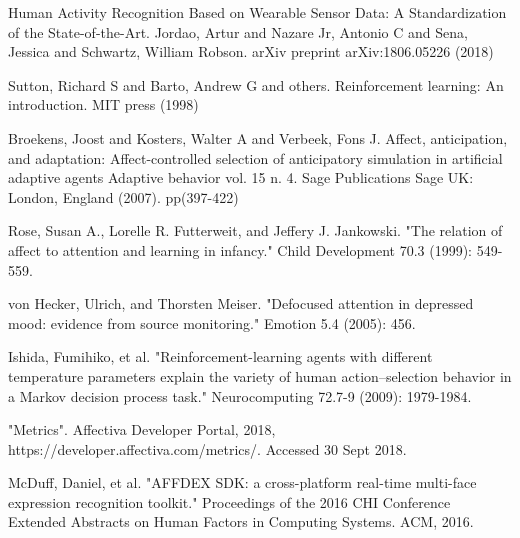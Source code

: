 \documentclass[conference]{IEEEtran}
\begin{document}
\begin{thebibliography}{1}
Human Activity Recognition Based on Wearable Sensor Data: A Standardization of the State-of-the-Art. Jordao, Artur and Nazare Jr, Antonio C and Sena, Jessica and Schwartz, William Robson. arXiv preprint arXiv:1806.05226 (2018)

Sutton, Richard S and Barto, Andrew G and others. Reinforcement learning: An introduction. MIT press (1998)

Broekens, Joost and Kosters, Walter A and Verbeek, Fons J. Affect, anticipation, and adaptation: Affect-controlled selection of anticipatory simulation in artificial adaptive agents Adaptive behavior vol. 15 n. 4. Sage Publications Sage UK: London, England (2007). pp(397-422)

Rose, Susan A., Lorelle R. Futterweit, and Jeffery J. Jankowski. "The relation of affect to attention and learning in infancy." Child Development 70.3 (1999): 549-559.

von Hecker, Ulrich, and Thorsten Meiser. "Defocused attention in depressed mood: evidence from source monitoring." Emotion 5.4 (2005): 456.

Ishida, Fumihiko, et al. "Reinforcement-learning agents with different temperature parameters explain the variety of human action–selection behavior in a Markov decision process task." Neurocomputing 72.7-9 (2009): 1979-1984.

 "Metrics". Affectiva Developer Portal, 2018, https://developer.affectiva.com/metrics/. Accessed 30 Sept 2018.

McDuff, Daniel, et al. "AFFDEX SDK: a cross-platform real-time multi-face expression recognition toolkit." Proceedings of the 2016 CHI Conference Extended Abstracts on Human Factors in Computing Systems. ACM, 2016.

\end{thebibliography}
\end{document}
